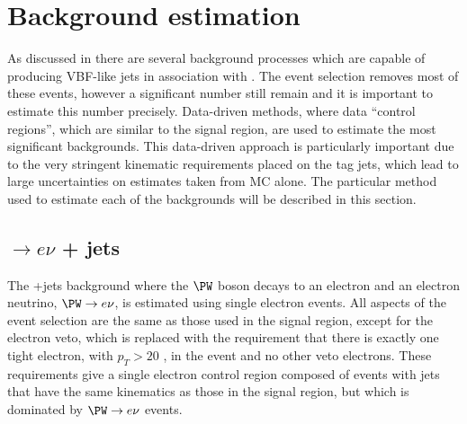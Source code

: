 \section{Background estimation}
\label{sec:promptbkg}
As discussed in  there are several background processes which are capable of producing VBF-like jets in association with \MET. The event selection removes most of these events, however a significant number still remain and it is important to estimate this number precisely. Data-driven methods, where data ``control regions'', which are similar to the signal region, are used to estimate the most significant backgrounds. This data-driven approach is particularly important due to the very stringent kinematic requirements placed on the tag jets, which lead to large uncertainties on estimates taken from \ac{MC} alone. The particular method used to estimate each of the backgrounds will be described in this section.

\subsection{\PW$\rightarrow e\nu$ + jets}
\label{sec:promptwenu}
The \PW+jets background where the $\PW$ boson decays to an electron and an electron neutrino, $\PW\rightarrow e\nu$, is estimated using single electron events. All aspects of the event selection are the same as those used in the signal region, except for the electron veto, which is replaced with the requirement that there is exactly one tight electron, with $p_{T}>20$ \GeV, in the event and no other veto electrons. These requirements give a single electron control region composed of events with jets that have the same kinematics as those in the signal region, but which is dominated by $\PW\rightarrow e\nu$ events.

